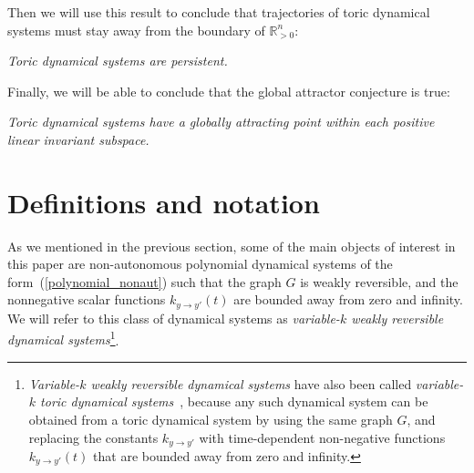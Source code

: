 \documentclass[12pt,letterpaper]{article}
\newcommand{\RRp}{\mathbb{R}_{>0}}
\begin{document}
\bigskip

Then we will use this result to conclude that  trajectories of toric dynamical systems must stay away from the boundary of $\RRp^n$:

\bigskip

 \emph{Toric dynamical systems are persistent. }


\bigskip

\noindent Finally, we will be able to conclude that the global attractor conjecture is true:


\bigskip

 \emph{Toric dynamical systems have a globally attracting point within each positive linear invariant subspace.}




















\newpage
\section{Definitions and notation}


\noindent
As we mentioned in the previous section, some of the main objects of interest in this paper are non-autonomous polynomial dynamical systems of the form~(\ref{polynomial_nonaut}) such that the graph $G$ is weakly reversible, and the nonnegative scalar functions $k_{y \to y'}(t)$ are bounded away from zero and infinity. We will refer to this class of dynamical systems as {\em variable-$k$  weakly reversible dynamical systems}\footnote{{\em Variable-$k$  weakly reversible dynamical systems} have also been called 
{\em variable-$k$  toric dynamical systems}~\cite{GAC_Proof_version_2}, because  any such dynamical system can be obtained from a toric dynamical system by using the same graph $G$, and replacing the constants $k_{y \to y'}$ with time-dependent non-negative functions $k_{y \to y'}(t)$ that are bounded away from zero and infinity. 
}. 

\end{document}
